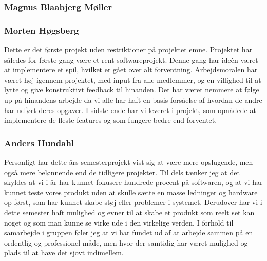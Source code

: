 \subsubsection{Magnus Blaabjerg Møller}

\subsubsection{Morten Høgsberg}
Dette er det første projekt uden restriktioner på projektet emne. Projektet har således for første gang
være et rent softwareprojekt. Denne gang har ideèn været at implementere et spil, hvilket er gået over
alt forventning. Arbejdsmoralen har været høj igennem projektet, med input fra alle medlemmer, og en
villighed til at lytte og give konstruktivt feedback til hinanden.
Det har været nemmere at følge up på hinandens arbejde da vi alle har haft en basis forsåelse af hvordan 
de andre har udført deres opgaver. I sidste ende har vi leveret i projekt, som opnådede at implementere
de fleste features og som fungere bedre end forventet. 

\subsubsection{Anders Hundahl}
Personligt har dette års semesterprojekt vist sig at være mere opslugende, men også mere belønnende end de tidligere projekter. Til dels tænker jeg at det skyldes at vi i år har kunnet fokusere hundrede procent på softwaren, og at vi har kunnet teste vores produkt uden at skulle sætte en masse ledninger og hardware op først, som har kunnet skabe støj eller problemer i systemet. Derudover har vi i dette semester haft mulighed og evner til at skabe et produkt som reelt set kan noget og som man kunne se virke ude i den virkelige verden. I forhold til samarbejde i gruppen føler jeg at vi har fundet ud af at arbejde sammen på en ordentlig og professionel måde, men hvor der samtidig har været mulighed og plads til at have det sjovt indimellem.